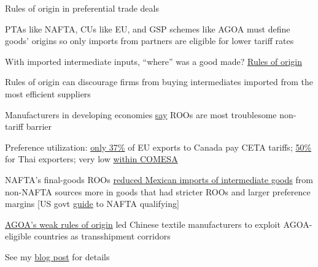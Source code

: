 \documentclass[11pt,notes=hide,aspectratio=169]{beamer}
\begin{document}
\begin{frame}{Rules of origin in preferential trade deals}
\begin{itemize}{\small
	\item PTAs like NAFTA, CUs like EU, and GSP schemes like AGOA
	must define goods' origins so only imports from partners are eligible for lower tariff rates
	\item With imported intermediate inputs, ``where'' was a good made?
	\href{https://www.wto.org/english/thewto_e/whatis_e/tif_e/agrm9_e.htm\#origin}{Rules of origin}
	\item Rules of origin can discourage firms from buying intermediates imported from the most efficient suppliers
	\item Manufacturers in developing economies \href{http://www.intracen.org/uploadedFiles/intracenorg/invisiblebarriers.pdf}{say} ROOs are most troublesome non-tariff barrier
	\item Preference utilization:
	\href{https://ec.europa.eu/transparency/regdoc/rep/1/2019/EN/COM-2019-455-F1-EN-MAIN-PART-1.PDF}{only 37\%} of EU exports to Canada pay CETA tariffs; %
	\href{https://www.bangkokpost.com/business/news/1213649/struggling-with-free-trade}{50\%} for Thai exporters;
	very low \href{https://unctad.org/news/simpler-rules-origin-needed-boost-free-trade-africa-study-shows}{within COMESA}
	\item NAFTA's final-goods ROOs \href{https://papers.ssrn.com/sol3/papers.cfm?abstract_id=2726564}{reduced Mexican imports of intermediate goods} from non-NAFTA sources more in goods that had stricter ROOs and larger preference margins [US govt \href{https://2016.export.gov/logistics/eg_main_018132.asp}{guide} to NAFTA qualifying]
	\item \href{http://voxeu.org/article/rise-and-fall-chinese-african-apparel-exports}{AGOA's weak rules of origin} led Chinese textile manufacturers to exploit AGOA-eligible countries as transshipment corridors
	\item See my \href{https://tradediversion.net/2016/10/25/measuring-rules-of-origin/}{blog post} for details
}\end{itemize}
\end{frame}
\end{document}
